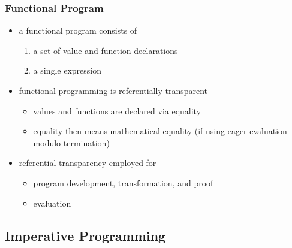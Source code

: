 \hypertarget{functional-program}{%
\subsubsection{Functional Program}\label{functional-program}}

\begin{itemize}
\item
  a functional program consists of

  \begin{enumerate}
  \def\labelenumi{\arabic{enumi}.}
  \tightlist
  \item
    a set of value and function declarations
  \item
    a single expression
  \end{enumerate}
\item
  functional programming is referentially transparent

  \begin{itemize}
  \tightlist
  \item
    values and functions are declared via equality
  \item
    equality then means mathematical equality (if using eager evaluation
    modulo termination)
  \end{itemize}
\item
  referential transparency employed for

  \begin{itemize}
  \tightlist
  \item
    program development, transformation, and proof
  \item
    evaluation
  \end{itemize}
\end{itemize}

\clearpage
\hypertarget{imperative-programming}{%
\subsection{Imperative Programming}\label{imperative-programming}}

